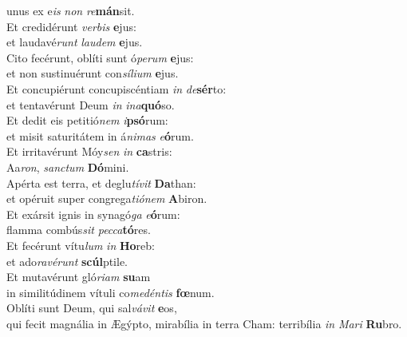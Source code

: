 \evenverse unus ex e\textit{is} \textit{non} \textit{re}\textbf{mán}sit.\\
\oddverse Et credidérunt \textit{ver}\textit{bis} \textbf{e}jus:~\*\\
\oddverse et laudavé\textit{runt} \textit{lau}\textit{dem} \textbf{e}jus.\\
\evenverse Cito fecérunt, oblíti sunt ó\textit{pe}\textit{rum} \textbf{e}jus:~\*\\
\evenverse et non sustinuérunt con\textit{sí}\textit{li}\textit{um} \textbf{e}jus.\\
\oddverse Et concupiérunt concupiscéntiam \textit{in} \textit{de}\textbf{sér}to:~\*\\
\oddverse et tentavérunt Deum \textit{in} \textit{i}\textit{na}\textbf{quó}so.\\
\evenverse Et dedit eis petitió\textit{nem} \textit{i}\textbf{psó}rum:~\*\\
\evenverse et misit saturitátem in á\textit{ni}\textit{mas} \textit{e}\textbf{ó}rum.\\
\oddverse Et irritavérunt Móy\textit{sen} \textit{in} \textbf{ca}stris:~\*\\
\oddverse Aa\textit{ron}, \textit{san}\textit{ctum} \textbf{Dó}mini.\\
\evenverse Apérta est terra, et deglu\textit{tí}\textit{vit} \textbf{Da}than:~\*\\
\evenverse et opéruit super congrega\textit{ti}\textit{ó}\textit{nem} \textbf{A}biron.\\
\oddverse Et exársit ignis in synagó\textit{ga} \textit{e}\textbf{ó}rum:~\*\\
\oddverse flamma combús\textit{sit} \textit{pec}\textit{ca}\textbf{tó}res.\\
\evenverse Et fecérunt vítu\textit{lum} \textit{in} \textbf{Ho}reb:~\*\\
\evenverse et ado\textit{ra}\textit{vé}\textit{runt} \textbf{scúl}ptile.\\
\oddverse Et mutavérunt gló\textit{ri}\textit{am} \textbf{su}am~\*\\
\oddverse in similitúdinem vítuli co\textit{me}\textit{dén}\textit{tis} \textbf{fœ}num.\\
\evenverse Oblíti sunt Deum, qui sal\textit{vá}\textit{vit} \textbf{e}os,~\*\\
\evenverse qui fecit magnália in Ægýpto, mirabília in terra Cham: terribília \textit{in} \textit{Ma}\textit{ri} \textbf{Ru}bro.\\
